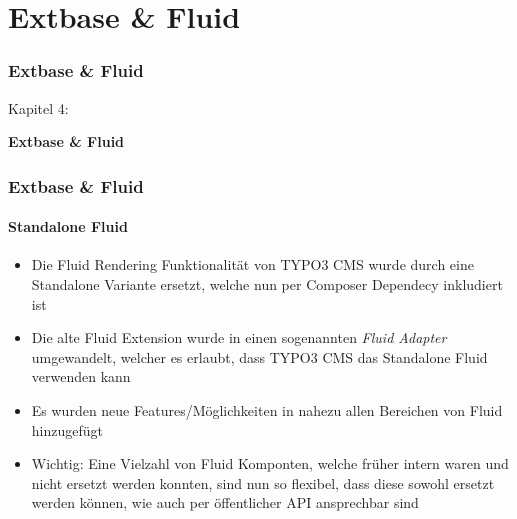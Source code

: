 %

\section{Extbase \& Fluid}
\begin{frame}[fragile]
	\frametitle{Extbase \& Fluid}

	\begin{center}\huge{Kapitel 4:}\end{center}
	\begin{center}\huge{\color{typo3darkgrey}\textbf{Extbase \& Fluid}}\end{center}

\end{frame}


\begin{frame}[fragile]
	\frametitle{Extbase \& Fluid}
	\framesubtitle{Standalone Fluid}

	\lstset{basicstyle=\tiny\ttfamily}

	\begin{itemize}

		\item Die Fluid Rendering Funktionalität von TYPO3 CMS wurde durch eine Standalone Variante ersetzt, welche nun per Composer Dependecy inkludiert ist

		\item Die alte Fluid Extension wurde in einen sogenannten \textit{Fluid Adapter} umgewandelt, welcher es erlaubt, dass TYPO3 CMS das Standalone Fluid verwenden kann

		\item Es wurden neue Features/Möglichkeiten in nahezu allen Bereichen von Fluid hinzugefügt

		\item Wichtig: Eine Vielzahl von Fluid Komponten, welche früher intern waren und nicht ersetzt werden konnten, sind nun so flexibel, dass diese sowohl ersetzt werden können, wie auch per öffentlicher API ansprechbar sind

	\end{itemize}

\end{frame}

